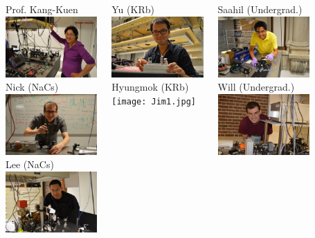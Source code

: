 \documentclass{beamer}
\begin{document}
\begin{frame}[t]
  \vspace{-0.8cm}
  \begin{columns}[t]
    \column{4cm}
    \begin{center}
      Prof. Kang-Kuen\\
      \includegraphics[width=3.5cm]{KangKuen.jpg}\\
      Nick (NaCs)\\
      \includegraphics[width=3.5cm]{Nick.jpg}\\
      Lee (NaCs)\\
      \includegraphics[width=3.5cm]{Lee.jpg}
    \end{center}
    \column{4cm}
    \begin{center}
      Yu (KRb)\\
      \includegraphics[width=3.5cm]{Yu.jpg}\\
      Hyungmok (KRb)\\
      \texttt{[image: Jim1.jpg]}
    \end{center}
    \column{4cm}
    \begin{center}
      Saahil (Undergrad.)\\
      \includegraphics[width=3.5cm]{Saahil.jpg}\\
      Will (Undergrad.)\\
      \includegraphics[width=3.5cm]{Will.jpg}
    \end{center}
  \end{columns}
\end{frame}
\end{document}
